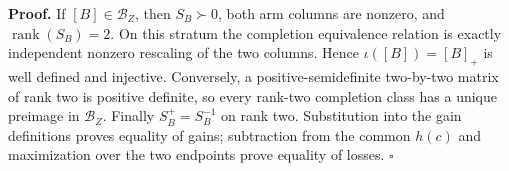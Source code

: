 \textbf{Proof.}
If \([B]\in\mathcal B_Z\), then \(S_B\succ0\), both arm columns are nonzero, and \(\operatorname{rank}(S_B)=2\).  On this stratum the completion equivalence relation is exactly independent nonzero rescaling of the two columns.  Hence \(\iota([B])=[B]_+\) is well defined and injective.  Conversely, a positive-semidefinite two-by-two matrix of rank two is positive definite, so every rank-two completion class has a unique preimage in \(\mathcal B_Z\).  Finally \(S_B^+=S_B^{-1}\) on rank two.  Substitution into the gain definitions proves equality of gains; subtraction from the common \(h(c)\) and maximization over the two endpoints prove equality of losses. \(\square\)